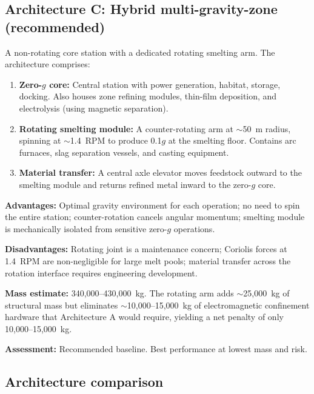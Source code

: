 \documentclass[preprint,12pt]{elsarticle}
\begin{document}
\subsection{Architecture C: Hybrid multi-gravity-zone (recommended)}

A non-rotating core station with a dedicated rotating smelting arm. The architecture comprises:

\begin{enumerate}
    \item \textbf{Zero-$g$ core:} Central station with power generation, habitat, storage, docking. Also houses zone refining modules, thin-film deposition, and electrolysis (using magnetic separation).
    \item \textbf{Rotating smelting module:} A counter-rotating arm at $\sim$50~m radius, spinning at $\sim$1.4~RPM to produce 0.1$g$ at the smelting floor. Contains arc furnaces, slag separation vessels, and casting equipment.
    \item \textbf{Material transfer:} A central axle elevator moves feedstock outward to the smelting module and returns refined metal inward to the zero-$g$ core.
\end{enumerate}

\textbf{Advantages:} Optimal gravity environment for each operation; no need to spin the entire station; counter-rotation cancels angular momentum; smelting module is mechanically isolated from sensitive zero-$g$ operations.

\textbf{Disadvantages:} Rotating joint is a maintenance concern; Coriolis forces at 1.4~RPM are non-negligible for large melt pools; material transfer across the rotation interface requires engineering development.

\textbf{Mass estimate:} 340,000--430,000~kg. The rotating arm adds $\sim$25,000~kg of structural mass but eliminates $\sim$10,000--15,000~kg of electromagnetic confinement hardware that Architecture A would require, yielding a net penalty of only 10,000--15,000~kg.

\textbf{Assessment:} Recommended baseline. Best performance at lowest mass and risk.

\subsection{Architecture comparison}
\end{document}

